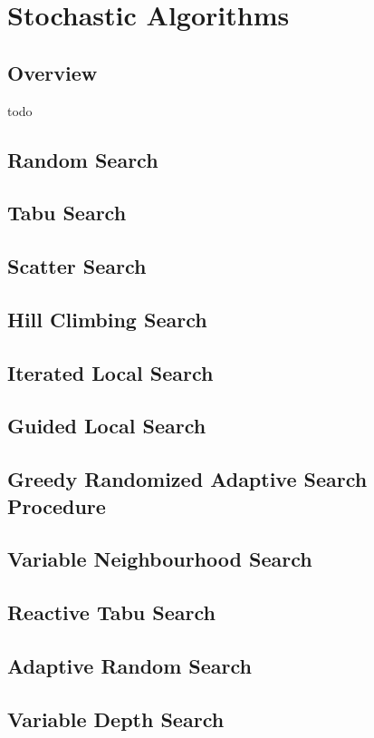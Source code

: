 \chapter{Stochastic Algorithms}
\label{ch:stochastic}

\section{Overview}
todo



\section{Random Search}
\section{Tabu Search}
\section{Scatter Search}
\section{Hill Climbing Search}
\section{Iterated Local Search}
\section{Guided Local Search}
\section{Greedy Randomized Adaptive Search Procedure}
\section{Variable Neighbourhood Search}
\section{Reactive Tabu Search}
\section{Adaptive Random Search}
\section{Variable Depth Search}
